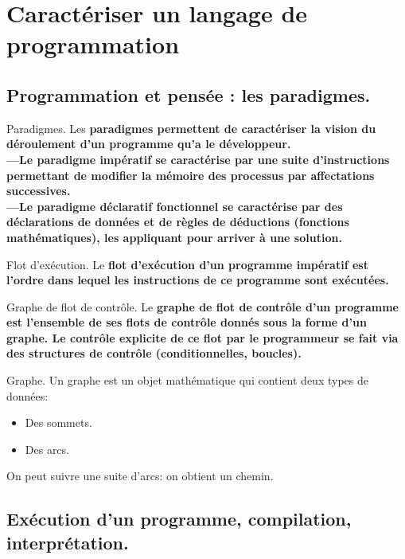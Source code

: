 \documentclass[french, 11pt]{article}
\begin{document}


\section{Caractériser un langage de programmation}

\subsection{Programmation et pensée : les paradigmes.}

\begin{defi}{Paradigmes.}{}
    Les \bf{paradigmes} permettent de caractériser la vision du déroulement d'un programme qu'a le développeur.\\
    ---Le paradigme impératif se caractérise par une suite d'instructions permettant de modifier la mémoire des processus par affectations successives.\\
    ---Le paradigme déclaratif fonctionnel se caractérise par des déclarations de données et de règles de déductions (fonctions mathématiques), les appliquant pour arriver à une solution.
\end{defi}

\begin{defi}{Flot d'exécution.}{}
    Le \bf{flot d'exécution} d'un programme impératif est l'ordre dans lequel les instructions de ce programme sont exécutées. 
\end{defi}

\begin{defi}{Graphe de flot de contrôle.}{}
    Le \bf{graphe de flot de contrôle} d'un programme est l'ensemble de ses flots de contrôle donnés sous la forme d'un graphe.\n
    Le contrôle explicite de ce flot par le programmeur se fait via des structures de contrôle (conditionnelles, boucles).
\end{defi}

\begin{defi}{Graphe.}{}
    Un graphe est un objet mathématique qui contient deux types de données:
    \begin{itemize}[topsep=0pt,itemsep=-0.9 ex, label=---]
        \item Des sommets.
        \item Des arcs.
    \end{itemize}
    On peut suivre une suite d'arcs: on obtient un chemin.
\end{defi}

\subsection{Exécution d'un programme, compilation, interprétation.}
\end{document}
